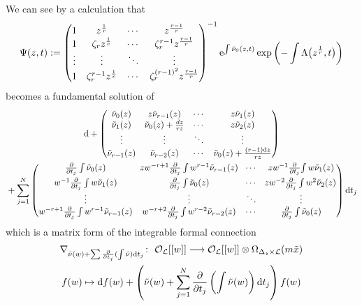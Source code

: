 \documentclass[pdftex]{sigma}
\numberwithin{equation}{section}
\begin{document}
We can see by a calculation that
\begin{equation} \label{equation: formal fundamental solution of ramified connection}
 \Psi(z,t):=
 \begin{pmatrix}
 1 & z^{\frac{1}{r}} & \cdots & z^{\frac{r-1}{r}} \\
 1 & \zeta_r z^{\frac{1}{r}} & \cdots & \zeta_r^{r-1}z^{\frac{r-1}{r}} \\
 \vdots & \vdots & \ddots & \vdots \\
 1 & \zeta_r^{r-1}z^{\frac{1}{r}} & \cdots & \zeta_r^{(r-1)^2}z^{\frac{r-1}{r}}
 \end{pmatrix}^{-1}
 {\rm e}^{\int\tilde{\nu}_0(z,t)}
 \exp\left({-}\int\Lambda\big(z^{\frac{1}{r}},t\big)\right)
\end{equation}
becomes a fundamental solution of
\begin{gather*}
{\rm d}+
 \begin{pmatrix}
 \tilde{\nu}_0(z) & z\tilde{\nu}_{r-1}(z) & \cdots & z\tilde{\nu}_1(z) \\
 \tilde{\nu}_1(z) & \tilde{\nu}_0(z)+\frac{dz}{rz} & \cdots & z\tilde{\nu}_2(z) \\
 \vdots & \vdots & \ddots & \vdots \\
 \tilde{\nu}_{r-1}(z) & \tilde{\nu}_{r-2}(z) & \cdots & \tilde{\nu}_0(z)+\frac{(r-1){\rm d}z}{rz}
 \end{pmatrix}
 \\
{} +
 \sum_{j=1}^N
 \begin{pmatrix}
 \frac{\partial}{\partial t_j} \int\tilde{\nu}_0(z) &
\! zw^{-r+1}\frac{\partial}{\partial t_j} \int w^{r-1}\tilde{\nu}_{r-1}(z)\!
 & \cdots & zw^{-1}\frac{\partial}{\partial t_j} \! \int w\tilde{\nu}_1(z) \vspace{1mm}\\
 w^{-1}\frac{\partial}{\partial t_j} \int w\tilde{\nu}_1(z) &
 \frac{\partial}{\partial t_j} \int\tilde{\nu}_0(z)
 & \cdots & \!zw^{-2}\frac{\partial}{\partial t_j} \int w^2\tilde{\nu}_2(z) \\
 \vdots & \vdots & \ddots & \vdots \\
 w^{-r+1}\frac{\partial}{\partial t_j} \int w^{r-1}\tilde{\nu}_{r-1}(z) &
 w^{-r+2}\frac{\partial}{\partial t_j} \int w^{r-2}\tilde{\nu}_{r-2}(z) & \cdots
 & \frac{\partial}{\partial t_j} \int\tilde{\nu}_0(z)
 \end{pmatrix} {\rm d}t_j
\end{gather*}
which is a matrix form of the integrable formal connection
\begin{gather*}
 \nabla_{\tilde{\nu}(w)+\sum\frac{\partial} {\partial t_j}(\int \tilde{\nu}) {\rm d}t_j}
 \colon \
 {\mathcal O}_{\mathcal L}[[w]] \longrightarrow
 {\mathcal O}_{\mathcal L}[[w]]\otimes \Omega_{\Delta_z\times{\mathcal L}}(m \tilde{x})
 \\
 f(w) \mapsto {\rm d}f(w)+
 \left( \tilde{\nu}(w)+\sum_{j=1}^N\frac{\partial} {\partial t_j}
 \left(\int \tilde{\nu}(w)\right) {\rm d}t_j \right)f(w)
\end{gather*}
\end{document}
